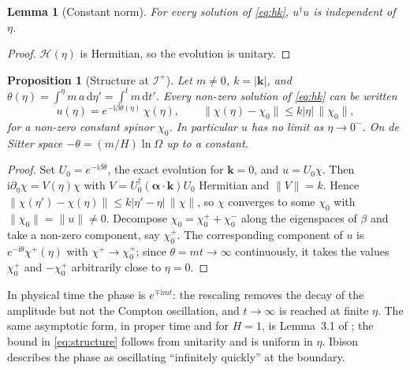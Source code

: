 \documentclass[11pt,a4paper]{article}
\newtheorem{proposition}{Proposition}
\newtheorem{lemma}{Lemma}
\theoremstyle{definition}
\newcommand{\scri}{\mathscr{I}^{+}}
\newcommand{\dd}{\mathrm{d}}
\newcommand{\ii}{\mathrm{i}}
\begin{document}
\begin{lemma}[Constant norm]
\label{lem:norm}
For every solution of \eqref{eq:hk}, $u^{\dagger}u$ is independent of $\eta$.
\end{lemma}
\begin{proof}
$\mathcal{H}(\eta)$ is Hermitian, so the evolution is unitary.
\end{proof}

\begin{proposition}[Structure at $\scri$]
\label{prop:dirac}
Let $m\neq0$, $k=|\mathbf{k}|$, and $\theta(\eta)=\int^{\eta}m\,a\,\dd\eta'=\int^{t}m\,\dd t'$. Every non-zero solution of \eqref{eq:hk} can be written
\begin{equation}
u(\eta)=e^{-\ii\beta\theta(\eta)}\,\chi(\eta),\qquad \|\chi(\eta)-\chi_{0}\|\le k|\eta|\,\|\chi_{0}\|,
\label{eq:structure}
\end{equation}
for a non-zero constant spinor $\chi_{0}$. In particular $u$ has no limit as $\eta\to0^{-}$. On de Sitter space $-\theta=(m/H)\ln\Omega$ up to a constant.
\end{proposition}
\begin{proof}
Set $U_{0}=e^{-\ii\beta\theta}$, the exact evolution for $\mathbf{k}=0$, and $u=U_{0}\chi$. Then $\ii\partial_{\eta}\chi=V(\eta)\chi$ with $V=U_{0}^{\dagger}(\boldsymbol\alpha\cdot\mathbf{k})U_{0}$ Hermitian and $\|V\|=k$. Hence $\|\chi(\eta')-\chi(\eta)\|\le k|\eta'-\eta|\,\|\chi\|$, so $\chi$ converges to some $\chi_{0}$ with $\|\chi_{0}\|=\|u\|\neq0$. Decompose $\chi_{0}=\chi_{0}^{+}+\chi_{0}^{-}$ along the eigenspaces of $\beta$ and take a non-zero component, say $\chi_{0}^{+}$. The corresponding component of $u$ is $e^{-\ii\theta}\chi^{+}(\eta)$ with $\chi^{+}\to\chi_{0}^{+}$; since $\theta=mt\to\infty$ continuously, it takes the values $\chi_{0}^{+}$ and $-\chi_{0}^{+}$ arbitrarily close to $\eta=0$.
\end{proof}

In physical time the phase is $e^{\mp\ii mt}$: the rescaling removes the decay of the amplitude but not the Compton oscillation, and $t\to\infty$ is reached at finite $\eta$. The same asymptotic form, in proper time and for $H=1$, is Lemma~3.1 of \cite{DFMR2019}; the bound in \eqref{eq:structure} follows from unitarity and is uniform in $\eta$. Ibison \cite{Ibison2011} describes the phase as oscillating ``infinitely quickly'' at the boundary.
\end{document}
